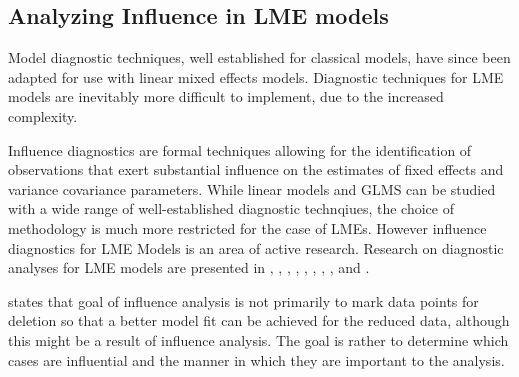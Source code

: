 \documentclass[12pt, a4paper]{report}
\theoremstyle{plain}
\theoremstyle{definition}
\theoremstyle{remark}
\begin{document}
	\subsection{Analyzing Influence in LME models}
	
	Model diagnostic techniques, well established for classical models, have since been adapted for use with linear mixed effects models. Diagnostic techniques for LME models are inevitably more difficult to implement, due to the increased complexity.
	
	Influence diagnostics are formal techniques allowing for the identification of observations that exert substantial  influence on the estimates of fixed effects and variance covariance parameters.
	While linear models and GLMS can be studied with a wide range of well-established diagnostic technqiues, the choice of methodology is much more restricted for the case of LMEs. However
	influence diagnostics for LME Models is an area of active research. Research on diagnostic analyses for LME models are presented in \citet{Beckman}, 
	\citet{Christensen}, \citet{HildenMinton}, \citet{lesaffre1998local}, \citet{Banerjee1997}, 
	\citet{fung2002}, \citet{Demi}, \citet{Zewotir}, \citet{zewotir2008} and \citet{NobreSinger2007, NobreSinger2011}.
	
	
	
	
	
	\citet{schabenberger} states that goal of influence analysis is not primarily to mark data
	points for deletion so that a better model fit can be achieved for the reduced data, although this might be a
	result of influence analysis. The goal is rather to determine which cases are influential and the manner in
	which they are important to the analysis. 
	
	
	
	
	
	
	
	
	
	
	
	
\end{document}
